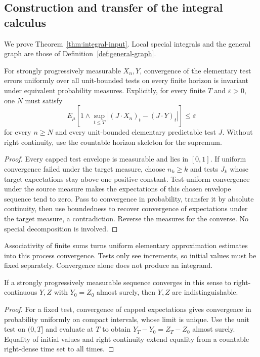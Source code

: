 \subsection{Construction and transfer of the integral calculus}
\label{sec:integral-calculus}
We prove Theorem~\ref{thm:integral-input}. Local special integrals and the general graph are those of Definition~\ref{def:general-graph}.

\begin{lemma}
For strongly progressively measurable $X_n,Y$, convergence of the elementary
test errors uniformly over all unit-bounded tests on every finite horizon is
invariant under equivalent probability measures. Explicitly, for every finite
$T$ and $\varepsilon>0$, one $N$ must satisfy
\[
 E_\mu\left[1\wedge\sup_{t\leq T}|(J\cdot X_n)_t-(J\cdot Y)_t|\right]
 \leq\varepsilon
\]
for every $n\geq N$ and every unit-bounded elementary predictable test $J$. Without right continuity,
use the countable horizon skeleton for the supremum.
\end{lemma}
\begin{proof}
Every capped test envelope is measurable and lies in $[0,1]$. If uniform
convergence failed under the target measure, choose $n_k\geq k$ and tests
$J_k$ whose target expectations stay above one positive constant.
Test-uniform convergence under the source measure makes the expectations of
this chosen envelope sequence tend to zero. Pass to convergence in probability,
transfer it by absolute continuity, then use boundedness to recover convergence
of expectations under the target measure, a contradiction. Reverse the
measures for the converse. No special decomposition is involved.
\end{proof}
Associativity of finite sums turns uniform elementary approximation estimates
into this process convergence. Tests only see increments, so initial values
must be fixed separately. Convergence alone does not produce an integrand.

\begin{lemma}
If a strongly progressively measurable sequence converges in this sense to
right-continuous $Y,Z$ with $Y_0=Z_0$ almost surely, then $Y,Z$ are indistinguishable.
\end{lemma}
\begin{proof}
For a fixed test, convergence of capped expectations gives convergence in
probability uniformly on compact intervals, whose limit is unique.
Use the unit test on $(0,T]$ and evaluate at $T$ to obtain
$Y_T-Y_0=Z_T-Z_0$ almost surely. Equality of initial values and right continuity
extend equality from a countable right-dense time set to all times.
\end{proof}

